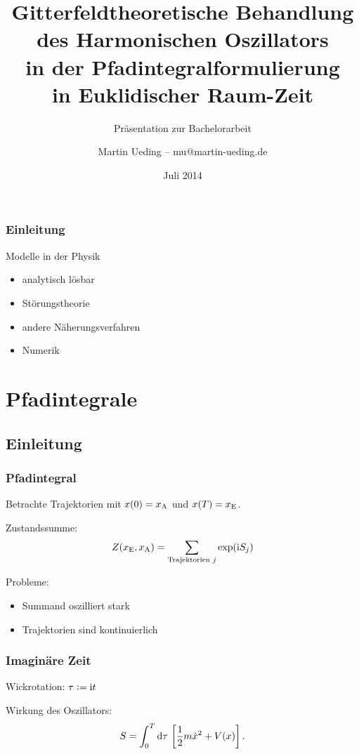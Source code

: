 \documentclass[ngerman, fleqn]{beamer}
\title{%
    Gitterfeldtheoretische Behandlung\\
    des Harmonischen Oszillators\\
    in der Pfadintegralformulierung\\
    in Euklidischer Raum-Zeit
}
\subtitle{Präsentation zur Bachelorarbeit}
\author{Martin Ueding – mu@martin-ueding.de}
\date{Juli 2014}
\renewcommand\iup{\text i}
\begin{document}
\begin{frame}
    \titlepage
\end{frame}

\begin{frame}
    \frametitle{Einleitung}

    Modelle in der Physik

    \begin{itemize}
        \item
            analytisch lösbar
        \item
            Störungstheorie
        \item
            andere Näherungsverfahren
        \item
            Numerik
    \end{itemize}
\end{frame}

\begin{frame}
    \tableofcontents
\end{frame}

\section{Pfadintegrale}

\subsection{Einleitung}

\begin{frame}
    \frametitle{Pfadintegral}

    Betrachte Trajektorien mit $x(0) = x_\text A$ und $x(T) = x_\text E$.

    Zustandssumme:
    \[
        Z(x_\text E, x_\text A) = \sum_{\text{Trajektorien $j$}} \exp(\iup S_j)
    \]

    Probleme:
    \begin{itemize}
        \item Summand oszilliert stark
        \item Trajektorien sind kontinuierlich
    \end{itemize}
\end{frame}

\begin{frame}
    \frametitle{Imaginäre Zeit}

    Wickrotation: $\tau := \iup t$

    Wirkung des Oszillators:
    \[
        S = \int_0^T \dif \tau \, \sbr{\frac 12 m \dot x^2 + V(x)}.
    \]
\end{frame}
\end{document}
